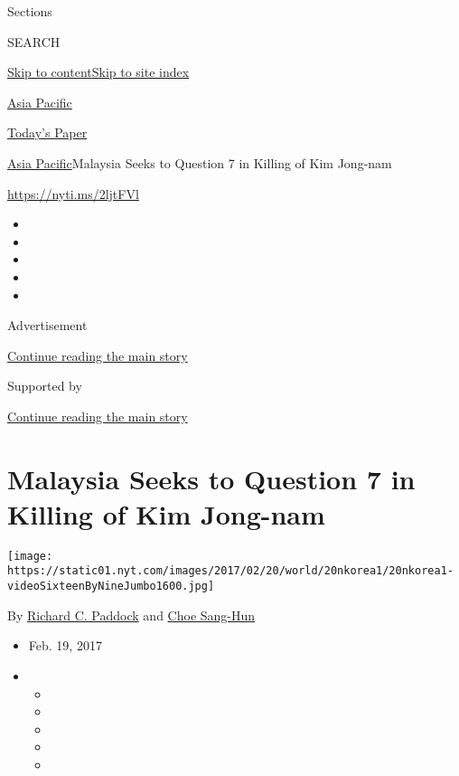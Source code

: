 Sections

SEARCH

\protect\hyperlink{site-content}{Skip to
content}\protect\hyperlink{site-index}{Skip to site index}

\href{https://www.nytimes.com/section/world/asia}{Asia Pacific}

\href{https://myaccount.nytimes.com/auth/login?response_type=cookie\&client_id=vi}{}

\href{https://www.nytimes.com/section/todayspaper}{Today's Paper}

\href{/section/world/asia}{Asia Pacific}\textbar{}Malaysia Seeks to
Question 7 in Killing of Kim Jong-nam

\url{https://nyti.ms/2ljtFVl}

\begin{itemize}
\item
\item
\item
\item
\item
\end{itemize}

Advertisement

\protect\hyperlink{after-top}{Continue reading the main story}

Supported by

\protect\hyperlink{after-sponsor}{Continue reading the main story}

\hypertarget{malaysia-seeks-to-question-7-in-killing-of-kim-jong-nam}{%
\section{Malaysia Seeks to Question 7 in Killing of Kim
Jong-nam}\label{malaysia-seeks-to-question-7-in-killing-of-kim-jong-nam}}

\texttt{[image: https://static01.nyt.com/images/2017/02/20/world/20nkorea1/20nkorea1-videoSixteenByNineJumbo1600.jpg]}

By \href{https://www.nytimes.com/by/richard-c-paddock}{Richard C.
Paddock} and \href{http://www.nytimes.com/by/choe-sang-hun}{Choe
Sang-Hun}

\begin{itemize}
\item
  Feb. 19, 2017
\item
  \begin{itemize}
  \item
  \item
  \item
  \item
  \item
  \end{itemize}
\end{itemize}

